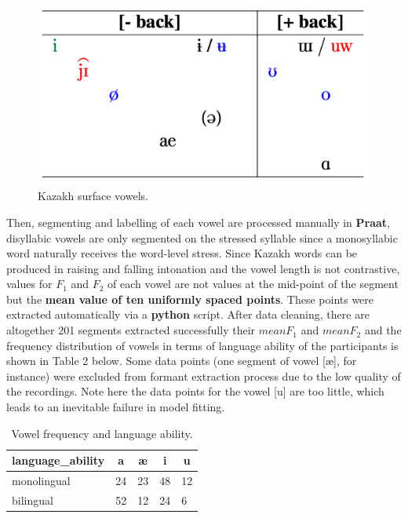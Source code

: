 \documentclass[
  man,floatsintext]{apa6}
\begin{document}
\begin{figure}

{\centering \includegraphics[width=0.45\linewidth]{finalimages/kazakhvowel} 

}

\caption{Kazakh surface vowels.}\label{fig:fig1}
\end{figure}

Then, segmenting and labelling of each vowel are processed manually in \textbf{Praat}, disyllabic vowels are only segmented on the stressed syllable since a monosyllabic word naturally receives the word-level stress. Since Kazakh words can be produced in raising and falling intonation and the vowel length is not contrastive, values for \(F_1\) and \(F_2\) of each vowel are not values at the mid-point of the segment but the \textbf{mean value of ten uniformly spaced points}. These points were extracted automatically via a \textbf{python} script. After data cleaning, there are altogether 201 segments extracted successfully their \(meanF_1\) and \(meanF_2\) and the frequency distribution of vowels in terms of language ability of the participants is shown in Table 2 below. Some data points (one segment of vowel {[}æ{]}, for instance) were excluded from formant extraction process due to the low quality of the recordings. Note here the data points for the vowel {[}u{]} are too little, which leads to an inevitable failure in model fitting.

\begin{table}[H]

\begin{center}
\begin{threeparttable}

\caption{\label{tab:table2}Vowel frequency and language ability.}

\begin{tabular}{lllll}
\toprule
language\_ability & \multicolumn{1}{c}{a} & \multicolumn{1}{c}{æ} & \multicolumn{1}{c}{i} & \multicolumn{1}{c}{u}\\
\midrule
monolingual & 24 & 23 & 48 & 12\\
bilingual & 52 & 12 & 24 & 6\\
\bottomrule
\end{tabular}

\end{threeparttable}
\end{center}

\end{table}
\end{document}
